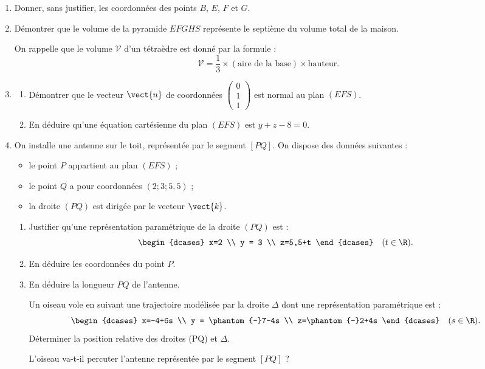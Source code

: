\begin{enumerate}
	\item Donner, sans justifier, les coordonnées des points $B$, $E$, $F$ et $G$.
	\item Démontrer que le volume de la pyramide $EFGHS$ représente le septième du volume total de la maison.
	
	On rappelle que le volume $\mathcal{V}$ d'un tétraèdre est donné par la formule : \[\mathcal{V} = \dfrac13 \times (\text{aire de la base}) \times  \text{hauteur}.\]
	\item 
	\begin{enumerate}
		\item Démontrer que le vecteur $\vect{n}$ de coordonnées $\begin{pmatrix}0\\1\\1\end{pmatrix}$ est normal au plan $(EFS)$.
		\item En déduire qu'une équation cartésienne du plan $(EFS)$ est $y + z - 8 = 0$.
	\end{enumerate}
	\item On installe une antenne sur le toit, représentée par le segment $[PQ]$. On dispose des données suivantes :
	
	\begin{itemize}
		\item le point $P$ appartient au plan $(EFS)$ ;
		\item le point $Q$ a pour coordonnées $(2;3;5,5)$ ;
		\item la droite $(PQ)$ est dirigée par le vecteur $\vect{k}$.
	\end{itemize}
	\begin{enumerate}
		\item Justifier qu'une représentation paramétrique de la droite $(PQ)$ est : \[ \begin{dcases}  x=2 \\ y = 3 \\ z=5,5+t \end{dcases} \quad (t \in \R).\]
		\item En déduire les coordonnées du point $P$.
		\item En déduire la longueur $PQ$ de l'antenne.
		
		Un oiseau vole en suivant une trajectoire modélisée par la droite $\Delta$ dont une représentation paramétrique est : \[ \begin{dcases}  x=-4+6s \\ y = \phantom{-}7-4s \\ z=\phantom{-}2+4s \end{dcases} \quad (s \in \R).\]%
		Déterminer la position relative des droites (PQ) et $\Delta$.
		
		L'oiseau va-t-il percuter l'antenne représentée par le segment $[PQ]$ ?
	\end{enumerate}
\end{enumerate}

